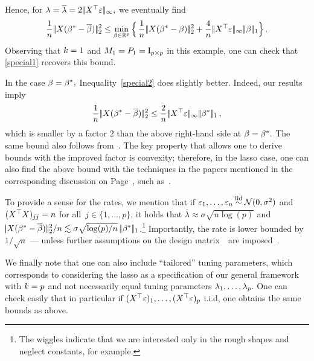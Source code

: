 \documentclass[bj]{imsart}
\newcommand{\normsup}[1]{\ensuremath{\!|\!| #1 | \! |_{\infty}}}
\newcommand{\normone}[1]{\ensuremath{\!|\!| #1 | \! |_{1}}}
\newcommand{\normtwo}[1]{\ensuremath{\!|\!| #1 | \! |_{2}}}
\newcommand{\1}{{\rm 1}\mskip -4,5mu{\rm l} }
\def\R{\mathbb{R}}
\newcommand{\betatrue}{\beta^*}
\newcommand{\lo}{\overline{\lambda}}
\newcommand{\genbeta}{\textcolor{black}{\beta}}
\begin{document}
Hence, for $\lambda=\lo=2\,\normsup{\design^\top\noise},$ we eventually find
\begin{equation*}
   \frac{1}{n}\, \normtwo{\design(\truth-\estimatororacle)}^2\leq\min_{\genbeta\in\R^p}\Big\{\, \frac{1}{n}\,\normtwo{\design(\betatrue-\genbeta)}^2+\frac{4}{n}\,\normsup{\design^\top\noise}\,\normone{\genbeta}\Big\}\,.
\end{equation*}
Observing that $k=1$ and $M_1=P_1=\operatorname{I}_{p\times p}$ in this example, one can check that \eqref{special1} recovers this bound.

In the case $\genbeta=\betatrue,$ Inequality~\eqref{special2} does slightly better. Indeed, our results imply
\begin{equation*}
\frac{1}{n}\,\normtwo{\design(\betatrue-\estimatororacle)}^2 \le \frac 2 n\,\normsup{\design  ^\top\noise}\,   \normone{\betatrue}\,,
\end{equation*} 
which is smaller by a factor $2$ than the above right-hand side at $\genbeta=\betatrue.$ 
The same bound also follows from~\cite[Inequality~(23)]{ScaledLasso11}.
The key property that allows one to derive bounds with the improved factor is convexity; therefore, in the lasso case, one can also find the above bound with the techniques in the papers mentioned in the corresponding discussion on Page~\pageref{convexityintro}, such as~\cite{Bellec16b,Kolt10,Koltchinskii09c}.

To provide a sense for the rates, we mention that if $\noise_1,\dots,\noise_n\iid\mathcal N(0,\sigma^2) $ and $(\textcolor{black}{X}^\top\textcolor{black}{X})_{jj}=n$ for all~$j\in\{1,\dots,p\}$, it holds that $\lo\approx \sigma\sqrt{n\log(p)}$ and $\normtwo{\design(\betatrue-\estimatororacle)}^2/n \lesssim \sigma\sqrt{\log(p)/n}\ \normone{\betatrue}$.\footnote{The wiggles indicate that we are interested only in the rough shapes and neglect constants, for example.} Importantly, the rate is lower bounded by $1/\sqrt n$ --- unless further assumptions on the design matrix~\design\ are imposed~\cite[Proposition~4]{ArnakMoYo14}.

We finally note that one can also include ``tailored'' tuning parameters, which corresponds to considering the lasso as a specification of our general framework with $k=p$ and not necessarily equal tuning parameters $\lambda_1,\dots,\lambda_p.$ One can check easily that in particular if $(\textcolor{black}{X}^\top\textcolor{black}{\varepsilon})_1,\dots,(\textcolor{black}{X}^\top\textcolor{black}{\varepsilon})_p$ i.i.d, one obtains the same bounds as above.
\end{document}
